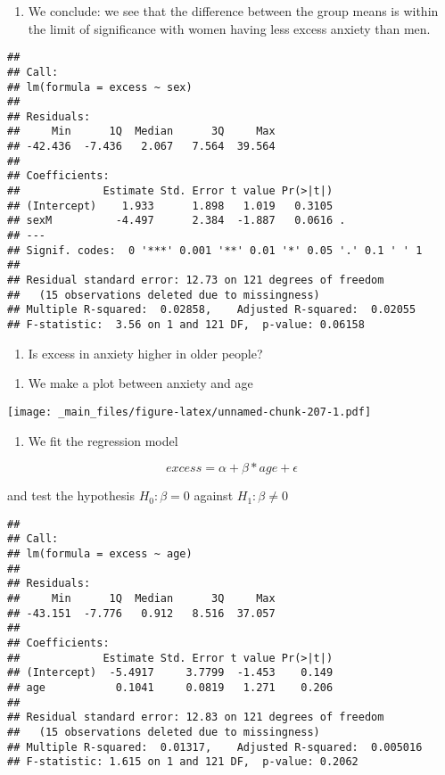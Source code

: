 \documentclass[
]{book}
\providecommand{\tightlist}{%
  \setlength{\itemsep}{0pt}\setlength{\parskip}{0pt}}
\begin{document}
\begin{enumerate}
\def\labelenumi{\alph{enumi}.}
\setcounter{enumi}{1}
\tightlist
\item
  We conclude: we see that the difference between the group means is within the limit of significance with women having less excess anxiety than men.
\end{enumerate}

\begin{verbatim}
## 
## Call:
## lm(formula = excess ~ sex)
## 
## Residuals:
##     Min      1Q  Median      3Q     Max 
## -42.436  -7.436   2.067   7.564  39.564 
## 
## Coefficients:
##             Estimate Std. Error t value Pr(>|t|)  
## (Intercept)    1.933      1.898   1.019   0.3105  
## sexM          -4.497      2.384  -1.887   0.0616 .
## ---
## Signif. codes:  0 '***' 0.001 '**' 0.01 '*' 0.05 '.' 0.1 ' ' 1
## 
## Residual standard error: 12.73 on 121 degrees of freedom
##   (15 observations deleted due to missingness)
## Multiple R-squared:  0.02858,    Adjusted R-squared:  0.02055 
## F-statistic:  3.56 on 1 and 121 DF,  p-value: 0.06158
\end{verbatim}

\begin{enumerate}
\def\labelenumi{\arabic{enumi}.}
\setcounter{enumi}{3}
\tightlist
\item
  Is excess in anxiety higher in older people?
\end{enumerate}

\begin{enumerate}
\def\labelenumi{\alph{enumi}.}
\tightlist
\item
  We make a plot between anxiety and age
\end{enumerate}

\texttt{[image: \_main\_files/figure-latex/unnamed-chunk-207-1.pdf]}

\begin{enumerate}
\def\labelenumi{\alph{enumi}.}
\setcounter{enumi}{1}
\tightlist
\item
  We fit the regression model
\end{enumerate}

\[excess = \alpha + \beta * age + \epsilon\]

and test the hypothesis \(H_0: \beta=0\) against \(H_1: \beta\neq 0\)

\begin{verbatim}
## 
## Call:
## lm(formula = excess ~ age)
## 
## Residuals:
##     Min      1Q  Median      3Q     Max 
## -43.151  -7.776   0.912   8.516  37.057 
## 
## Coefficients:
##             Estimate Std. Error t value Pr(>|t|)
## (Intercept)  -5.4917     3.7799  -1.453    0.149
## age           0.1041     0.0819   1.271    0.206
## 
## Residual standard error: 12.83 on 121 degrees of freedom
##   (15 observations deleted due to missingness)
## Multiple R-squared:  0.01317,    Adjusted R-squared:  0.005016 
## F-statistic: 1.615 on 1 and 121 DF,  p-value: 0.2062
\end{verbatim}
\end{document}
